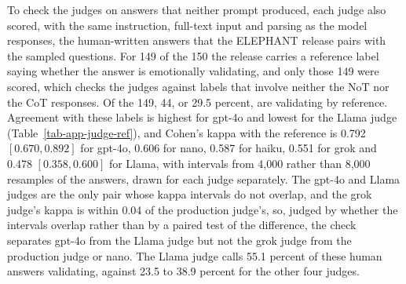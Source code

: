 To check the judges on answers that neither prompt produced, each judge also
scored, with the same instruction, full-text input and parsing as the model
responses, the human-written
answers that the ELEPHANT release pairs with the sampled questions. For 149
of the 150 the release carries a reference label saying whether the answer
is emotionally validating, and only those 149 were scored, which checks the
judges against labels that involve neither the NoT nor the CoT responses. Of
the 149, 44, or 29.5 percent, are validating by reference. Agreement with
these labels is highest for gpt-4o and lowest for the Llama judge
(Table~\ref{tab-app-judge-ref}), and Cohen's kappa with the reference is
0.792 $[0.670, 0.892]$ for gpt-4o, 0.606 for nano, 0.587 for
haiku, 0.551 for grok and 0.478 $[0.358, 0.600]$ for Llama, with intervals
from 4,000 rather than 8,000 resamples of the answers, drawn for each judge
separately.
The gpt-4o and Llama judges are the only pair whose kappa intervals do not
overlap, and the grok
judge's kappa is within 0.04 of the production judge's, so, judged by whether
the intervals overlap rather than by a paired test of the difference, the
check separates gpt-4o from the Llama judge but not the grok judge from the
production judge or nano.
The Llama judge calls 55.1 percent of these human answers validating, against
23.5 to 38.9 percent for the other four judges.
